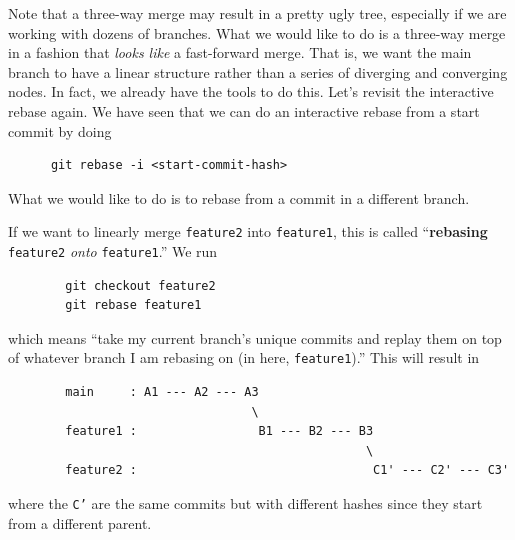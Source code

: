     Note that a three-way merge may result in a pretty ugly tree, especially if we are working with dozens of branches. What we would like to do is a three-way merge in a fashion that \textit{looks like} a fast-forward merge. That is, we want the main branch to have a linear structure rather than a series of diverging and converging nodes. In fact, we already have the tools to do this. Let's revisit the interactive rebase again. We have seen that we can do an interactive rebase from a start commit by doing 
    \begin{lstlisting}
      git rebase -i <start-commit-hash>
    \end{lstlisting} 
    What we would like to do is to rebase from a commit in a different branch. 

    \begin{definition}[Rebase]
      If we want to linearly merge \texttt{feature2} into \texttt{feature1}, this is called ``\textbf{rebasing} \texttt{feature2} \textit{onto} \texttt{feature1}.'' We run 
      \begin{lstlisting}
        git checkout feature2 
        git rebase feature1
      \end{lstlisting} 
      which means ``take my current branch's unique commits and replay them on top of whatever branch I am rebasing on (in here, \texttt{feature1}).'' This will result in 
      \begin{lstlisting}
        main     : A1 --- A2 --- A3
                                  \
        feature1 :                 B1 --- B2 --- B3
                                                  \
        feature2 :                                 C1' --- C2' --- C3' 
      \end{lstlisting} 
      where the \texttt{C'} are the same commits but with different hashes since they start from a different parent. 
    \end{definition} 


